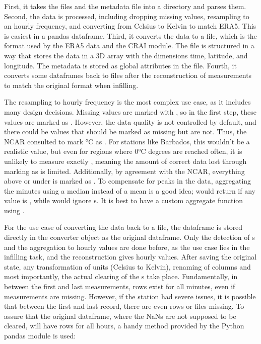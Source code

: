 First, it takes the  files and the metadata file into a directory and parses them. 
Second, the data is processed, including dropping missing values, resampling to an hourly frequency, and converting from Celsius to Kelvin to match ERA5. 
This is easiest in a pandas dataframe. 
Third, it converts the data to a  file, which is the format used by the ERA5 data and the CRAI module. 
The  file is structured in a way that stores the data in a 3D array with the dimensions time, latitude, and longitude. 
The metadata is stored as global attributes in the  file. 
Fourth, it converts some dataframes back to  files after the reconstruction of measurements to match the original format when infilling.

The resampling to hourly frequency is the most complex use case, as it includes many design decisions. 
Missing values are marked with , so in the first step, these values are marked as . 
However, the data quality is not controlled by default, and there could be values that should be marked as missing but are not. 
Thus, the NCAR consulted to mark  °C as . 
For stations like Barbados, this wouldn't be a realistic value, but even for regions where 0°C degrees are reached often, it is unlikely to measure exactly , meaning the amount of correct data lost through marking  as  is limited. 
Additionally, by agreement with the NCAR, everything above or under  is marked as . 
To compensate for peaks in the data, aggregating the minutes using a median instead of a mean is a good idea;  would return  if any value is , while  would ignore s. 
It is best to have a custom aggregate function using .

For the use case of converting the data back to a  file, the dataframe is stored directly in the converter object as the original dataframe. Only the detection of s and the aggregation to hourly values are done before, as the use case lies in the infilling task, and the reconstruction gives hourly values.
After saving the original state, any transformation of units (Celsius to Kelvin), renaming of columns and most importantly, the actual clearing of the s take place.
Fundamentally, in between the first and last measurements, rows exist for all minutes, even if measurements are missing.
However, if the station had severe issues, it is possible that between the first and last record, there are even rows or files missing.
To assure that the original dataframe, where the NaNs are not supposed to be cleared, will have rows for all hours, a handy method provided by the Python pandas module is used:

